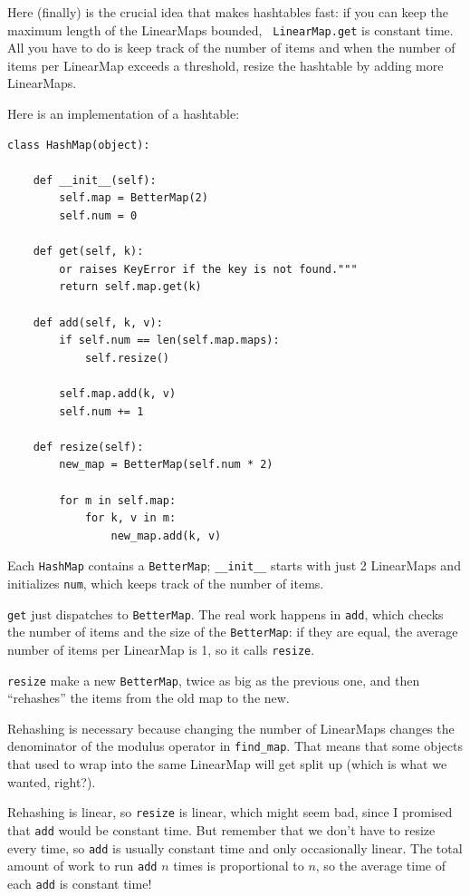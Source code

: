 \documentclass[10pt]{book}
\begin{document}
Here (finally) is the crucial idea that makes hashtables fast: if you
can keep the maximum length of the LinearMaps bounded, {\tt
  LinearMap.get} is constant time.  All you have to do is keep track
of the number of items and when the number of
items per LinearMap exceeds a threshold, resize the hashtable by
adding more LinearMaps.

Here is an implementation of a hashtable:

\begin{verbatim}
class HashMap(object):

    def __init__(self):
        self.map = BetterMap(2)
        self.num = 0

    def get(self, k):
        or raises KeyError if the key is not found."""
        return self.map.get(k)

    def add(self, k, v):
        if self.num == len(self.map.maps):
            self.resize()

        self.map.add(k, v)
        self.num += 1

    def resize(self):
        new_map = BetterMap(self.num * 2)

        for m in self.map:
            for k, v in m:
                new_map.add(k, v)
\end{verbatim}

Each {\tt HashMap} contains a {\tt BetterMap}; \verb"__init__" starts
with just 2 LinearMaps and initializes {\tt num}, which keeps track of
the number of items.

{\tt get} just dispatches to {\tt BetterMap}.  The real work happens
in {\tt add}, which checks the number of items and the size of the
{\tt BetterMap}: if they are equal, the average number of items per
LinearMap is 1, so it calls {\tt resize}.

{\tt resize} make a new {\tt BetterMap}, twice as big as the previous
one, and then ``rehashes'' the items from the old map to the new.

Rehashing is necessary because changing the number of LinearMaps
changes the denominator of the modulus operator in
\verb"find_map".  That means that some objects that used
to wrap into the same LinearMap will get split up (which is
what we wanted, right?).

Rehashing is linear, so 
{\tt resize} is linear, which might seem bad, since I promised
that {\tt add} would be constant time.  But remember that
we don't have to resize every time, so {\tt add} is usually
constant time and only occasionally linear.  The total amount
of work to run {\tt add} $n$ times is proportional to $n$,
so the average time of each {\tt add} is constant time!
\end{document}
